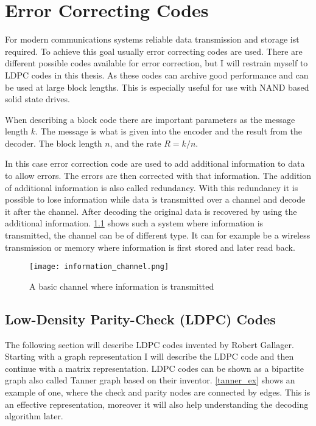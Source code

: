 
\chapter{Error Correcting Codes}

For modern communications systems reliable data transmission and storage ist required. To achieve this goal usually error correcting codes are used. There are different possible codes available for error correction, but I will restrain myself to LDPC\cite{Ga63} codes in this thesis. As these codes can archive good performance and can be used at large block lengths\cite{TaSc2017}. This is especially useful for use with NAND based solid state drives.

When describing a block code there are important parameters as the message length $k$. The message is what is given into the encoder and the result from the decoder. The block length $n$, and the rate $R = k / n$. 

In this case error correction code are used to add additional information to data to allow errors. The errors are then corrected with that information. The addition of additional information is also called redundancy. With this redundancy it is possible to lose information while data is transmitted over a channel and decode it after the channel. After decoding the original data is recovered by using the additional information. \cref{channel_basic} shows such a system where information is transmitted, the channel can be of different type. It can for example be a wireless transmission or memory where information is first stored and later read back. 

\begin{figure}
	\texttt{[image: information\_channel.png]}
	\centering
	\caption{A basic channel where information is transmitted}	
	\label{channel_basic}
\end{figure}

\section{Low-Density Parity-Check (LDPC) Codes}

The following section will describe LDPC codes invented by Robert Gallager\cite{Ga63}. Starting with a graph representation I will describe the LDPC code and then continue with a matrix representation. LDPC codes can be shown as a bipartite graph also called Tanner graph\cite{Ta81} based on their inventor. \cref{tanner_ex} shows an example of one, where the check and parity nodes are connected by edges. This is an effective representation, moreover it will also help understanding the decoding algorithm later.

